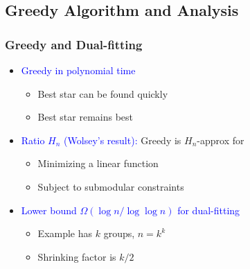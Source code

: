 \documentclass[hyperref,dvipsnames,svgnames,compress]{beamer}
\begin{document}
\subsection[Dual-fitting]{Greedy Algorithm and Analysis}
\begin{frame}
  \frametitle{Greedy and Dual-fitting}
  \begin{itemize}\addtolength{\itemsep}{1\baselineskip}
  \item \textcolor{blue}{Greedy in polynomial time}
    \begin{itemize}
    \item Best star can be found quickly
    \item Best star remains best
    \end{itemize}
  \item \textcolor{blue}{Ratio $H_n$ (Wolsey's result):}
    Greedy is $H_n$-approx for
    \begin{itemize}
    \item Minimizing a linear function
    \item Subject to submodular constraints
    \end{itemize}
  \item \textcolor{blue}{Lower bound $\Omega(\log n / \log\log n)$ for dual-fitting}
    \begin{itemize}
    \item Example has $k$ groups, $n = k^k$
    \item Shrinking factor is $k/2$
    \end{itemize}
  \end{itemize}
\end{frame}
\end{document}
